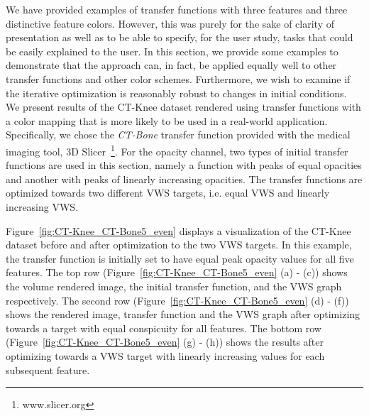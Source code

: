 We have provided examples of transfer functions with three features and three distinctive feature colors. However, this was 
purely for the sake of clarity of presentation as well as to be able to specify, for the user study, tasks that could be easily explained to the user. In this section, we provide some examples to demonstrate that the approach can, in fact, be applied equally well to other transfer functions and other color schemes. Furthermore, we wish to examine if the iterative optimization is reasonably robust to changes in initial conditions. 
We present results of the CT-Knee dataset rendered using transfer functions with a color mapping that is more likely to be used in a real-world application. Specifically, we chose the \emph{CT-Bone} transfer function provided with the medical imaging tool, 3D Slicer~\footnote{www.slicer.org}. For the opacity channel, two types of initial transfer functions are used in this section, namely a function with peaks of equal opacities and another with peaks of linearly increasing opacities. The transfer functions are optimized towards two different VWS targets, i.e. equal VWS and linearly increasing VWS.


Figure~\ref{fig:CT-Knee_CT-Bone5_even} displays a visualization of the CT-Knee dataset before and after optimization to the two VWS targets. In this example, the transfer function is initially set to have equal peak opacity values for all five features. The top row (Figure~\ref{fig:CT-Knee_CT-Bone5_even} (a) - (c)) shows the volume rendered image, the initial transfer function, and the VWS graph respectively. The second row (Figure~\ref{fig:CT-Knee_CT-Bone5_even} (d) - (f))  shows the rendered image, transfer function and the VWS graph after optimizing towards a target with equal conspicuity for all features. The bottom row (Figure~\ref{fig:CT-Knee_CT-Bone5_even} (g) - (h))  shows the results after optimizing towards a VWS target with linearly increasing values for each subsequent feature.


